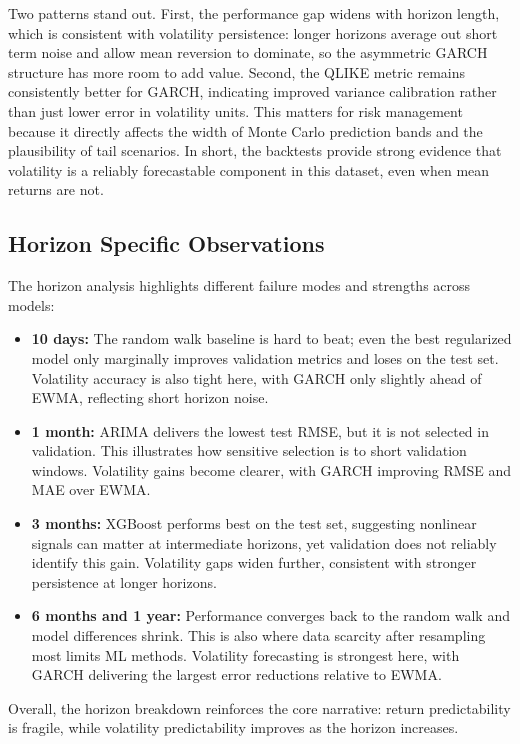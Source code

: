 \documentclass[11pt,a4paper]{article}
\begin{document}
Two patterns stand out. First, the performance gap widens with horizon length, which is consistent with volatility persistence: longer horizons average out short term noise and allow mean reversion to dominate, so the asymmetric GARCH structure has more room to add value. Second, the QLIKE metric remains consistently better for GARCH, indicating improved variance calibration rather than just lower error in volatility units. This matters for risk management because it directly affects the width of Monte Carlo prediction bands and the plausibility of tail scenarios. In short, the backtests provide strong evidence that volatility is a reliably forecastable component in this dataset, even when mean returns are not.

\subsection{Horizon Specific Observations}
The horizon analysis highlights different failure modes and strengths across models:
\begin{itemize}
    \item \textbf{10 days:} The random walk baseline is hard to beat; even the best regularized model only marginally improves validation metrics and loses on the test set. Volatility accuracy is also tight here, with GARCH only slightly ahead of EWMA, reflecting short horizon noise.
    \item \textbf{1 month:} ARIMA delivers the lowest test RMSE, but it is not selected in validation. This illustrates how sensitive selection is to short validation windows. Volatility gains become clearer, with GARCH improving RMSE and MAE over EWMA.
    \item \textbf{3 months:} XGBoost performs best on the test set, suggesting nonlinear signals can matter at intermediate horizons, yet validation does not reliably identify this gain. Volatility gaps widen further, consistent with stronger persistence at longer horizons.
    \item \textbf{6 months and 1 year:} Performance converges back to the random walk and model differences shrink. This is also where data scarcity after resampling most limits ML methods. Volatility forecasting is strongest here, with GARCH delivering the largest error reductions relative to EWMA.
\end{itemize}
Overall, the horizon breakdown reinforces the core narrative: return predictability is fragile, while volatility predictability improves as the horizon increases.
\end{document}
